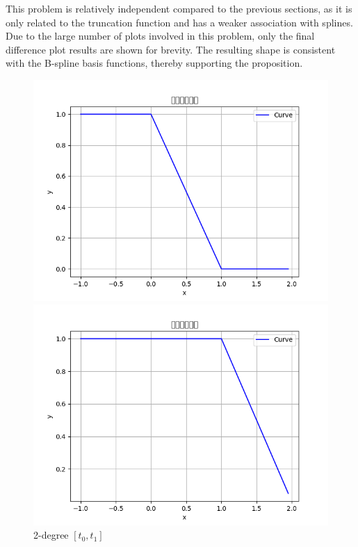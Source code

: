 \documentclass[a4paper]{article}
\begin{document}
This problem is relatively independent compared to the previous sections, as it is only related to the truncation function and has a weaker association with splines. Due to the large number of plots involved in this problem, only the final difference plot results are shown for brevity. The resulting shape is consistent with the B-spline basis functions, thereby supporting the proposition.
\begin{figure}[h]
    \centering
    \begin{minipage}{0.3\textwidth}
        \centering
        \includegraphics[width=\linewidth]{../figure/n1_1.png} 
        \caption{2-degree \([t_0,t_1]\)}
    \end{minipage}
    \hfill
    \begin{minipage}{0.3\textwidth}
        \centering
        \includegraphics[width=\linewidth]{../figure/n1_2.png} 

\end{minipage}
\end{figure}
\end{document}
